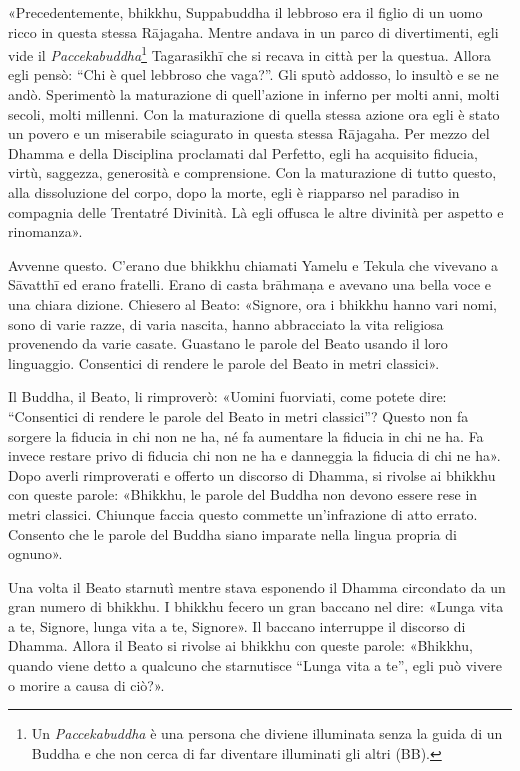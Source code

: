 «Precedentemente, bhikkhu, Suppabuddha il lebbroso era il figlio di un uomo
ricco in questa stessa Rājagaha. Mentre andava in un parco di divertimenti, egli
vide il \emph{Paccekabuddha}\footnote{Un \emph{Paccekabuddha} è una persona che
  diviene illuminata senza la guida di un Buddha e che non cerca di far
  diventare illuminati gli altri (BB).} Tagarasikhī che si recava in città per
la questua. Allora egli pensò: “Chi è quel lebbroso che vaga?”. Gli sputò
addosso, lo insultò e se ne andò. Sperimentò la maturazione di quell’azione in
inferno per molti anni, molti secoli, molti millenni. Con la maturazione di
quella stessa azione ora egli è stato un povero e un miserabile sciagurato in
questa stessa Rājagaha. Per mezzo del Dhamma e della Disciplina proclamati dal
Perfetto, egli ha acquisito fiducia, virtù, saggezza, generosità e comprensione.
Con la maturazione di tutto questo, alla dissoluzione del corpo, dopo la morte,
egli è riapparso nel paradiso in compagnia delle Trentatré Divinità. Là egli
offusca le altre divinità per aspetto e rinomanza».


 Avvenne questo. C’erano due bhikkhu chiamati Yamelu e
Tekula che vivevano a Sāvatthī ed erano fratelli. Erano di casta brāhmaṇa e
avevano una bella voce e una chiara dizione. Chiesero al Beato: «Signore, ora i
bhikkhu hanno vari nomi, sono di varie razze, di varia nascita, hanno
abbracciato la vita religiosa provenendo da varie casate. Guastano le parole del
Beato usando il loro linguaggio. Consentici di rendere le parole del Beato in
metri classici».

Il Buddha, il Beato, li rimproverò: «Uomini fuorviati, come potete dire:
“Consentici di rendere le parole del Beato in metri classici”? Questo non fa
sorgere la fiducia in chi non ne ha, né fa aumentare la fiducia in chi ne ha. Fa
invece restare privo di fiducia chi non ne ha e danneggia la fiducia di chi ne
ha». Dopo averli rimproverati e offerto un discorso di Dhamma, si rivolse ai
bhikkhu con queste parole: «Bhikkhu, le parole del Buddha non devono essere rese
in metri classici. Chiunque faccia questo commette un’infrazione di atto errato.
Consento che le parole del Buddha siano imparate nella lingua propria di
ognuno».


Una volta il Beato starnutì mentre stava esponendo il Dhamma circondato da un
gran numero di bhikkhu. I bhikkhu fecero un gran baccano nel dire: «Lunga vita a
te, Signore, lunga vita a te, Signore». Il baccano interruppe il discorso di
Dhamma. Allora il Beato si rivolse ai bhikkhu con queste parole: «Bhikkhu,
quando viene detto a qualcuno che starnutisce “Lunga vita a te”, egli può vivere
o morire a causa di ciò?».

